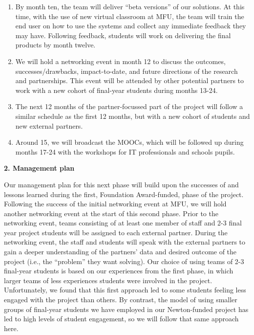 \documentclass[11pt]{article}
\begin{document}
\begin{enumerate}[leftmargin=6mm,itemsep=-3pt,topsep=1pt]
  \item By month ten, the team will deliver “beta versions” of our solutions. At this time, with the use of new virtual classroom at MFU, the team will train the end user on how to use the systems and collect any immediate feedback they may have. Following feedback, students will work on delivering the final products by month twelve.
  \item We will hold a networking event in month 12 to discuss the outcomes, successes/drawbacks, impact-to-date, and future directions of the research and partnerships. This event will be attended by other potential partners to work with a new cohort of final-year students during months 13-24.
  \item The next 12 months of the partner-focussed part of the project will follow a similar schedule as the first 12 months, but with a new cohort of students and new external partners.
  \item Around 15, we will broadcast the MOOCs, which will be followed up during months 17-24 with the workshops for IT professionals and schools pupils.
  \end{enumerate}
  
  \pagebreak

  \vspace{3mm}
  \noindent
  {\large \bf 2. Management plan}
    
  \noindent
  Our management plan for this next phase will build upon the successes of and lessons learned during the first, Foundation Award-funded, phase of the project. Following the success of the initial networking event at MFU, we will hold another networking event at the start of this second phase. Prior to the networking event, teams consisting of at least one member of staff and 2-3 final year project students will be assigned to each external partner. During the networking event, the staff and students will speak with the external partners to gain a deeper understanding of the partners' data and desired outcome of the project (i.e., the ``problem'' they want solving). Our choice of using teams of 2-3 final-year students is based on our experiences from the first phase, in which larger teams of less experiences students were involved in the project. Unfortunately, we found that this first approach led to some students feeling less engaged with the project than others. By contrast, the model of using smaller groups of final-year students we have employed in our Newton-funded project has led to high levels of student engagement, so we will follow that same approach here.
  
\end{document}
